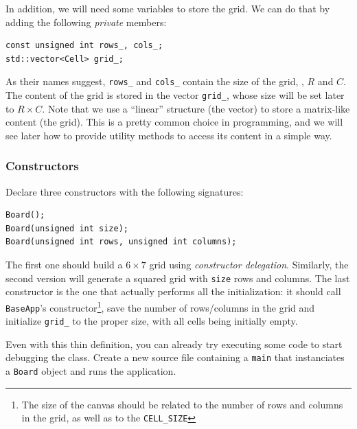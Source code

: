 \documentclass{article}
\begin{document}
In addition, we will need some variables to store the grid. We can do that by adding the following \emph{private} members:
\begin{center}
\begin{minipage}{.9\textwidth}
\begin{lstlisting}[style=mycpp,numbers=none]
const unsigned int rows_, cols_;
std::vector<Cell> grid_;
\end{lstlisting}
\end{minipage}
\end{center}
As their names suggest, \texttt{rows\string_} and \texttt{cols\string_} contain the size of the grid, \ie, $R$ and $C$. The content of the grid is stored in the vector \texttt{grid\string_}, whose size will be set later to $R\times C$. Note that we use a ``linear'' structure (the vector) to store a matrix-like content (the grid). This is a pretty common choice in programming, and we will see later how to provide utility methods to access its content in a simple way.

\subsubsection{Constructors}

Declare three constructors with the following signatures:
\begin{center}
\begin{minipage}{.9\textwidth}
\begin{lstlisting}[style=mycpp,numbers=none]
Board();
Board(unsigned int size);
Board(unsigned int rows, unsigned int columns);
\end{lstlisting}
\end{minipage}
\end{center}
The first one should build a $6\times 7$ grid using \emph{constructor delegation}. Similarly, the second version will generate a squared grid with \texttt{size} rows and columns. The last constructor is the one that actually performs all the initialization: it should call \texttt{BaseApp}'s constructor\footnote{The size of the canvas should be related to the number of rows and columns in the grid, as well as to the \texttt{CELL\string_SIZE}}, save the number of rows/columns in the grid and initialize \texttt{grid\string_} to the proper size, with all cells being initially empty.

Even with this thin definition, you can already try executing some code to start debugging the class. Create a new source file containing a \texttt{main} that instanciates a \texttt{Board} object and runs the application.
\end{document}
